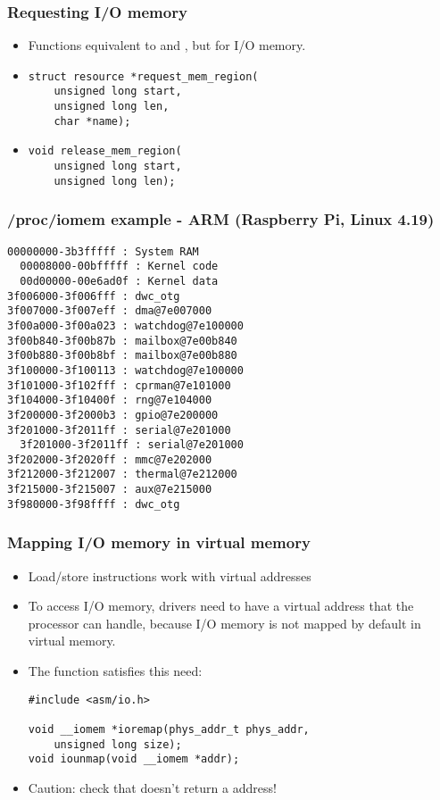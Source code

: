 \begin{frame}[fragile]
  \frametitle{Requesting I/O memory}
  \begin{itemize}
  \item Functions equivalent to  and
    , but for I/O memory.
  \item
\begin{verbatim}
struct resource *request_mem_region(
    unsigned long start,
    unsigned long len,
    char *name);
\end{verbatim}
  \item
\begin{verbatim}
void release_mem_region(
    unsigned long start,
    unsigned long len);
  \end{verbatim}
\end{itemize}
\end{frame}

\begin{frame}[fragile]
  \frametitle{/proc/iomem example - ARM (Raspberry Pi, Linux 4.19)}
{\small
\begin{verbatim}
00000000-3b3fffff : System RAM
  00008000-00bfffff : Kernel code
  00d00000-00e6ad0f : Kernel data
3f006000-3f006fff : dwc_otg
3f007000-3f007eff : dma@7e007000
3f00a000-3f00a023 : watchdog@7e100000
3f00b840-3f00b87b : mailbox@7e00b840
3f00b880-3f00b8bf : mailbox@7e00b880
3f100000-3f100113 : watchdog@7e100000
3f101000-3f102fff : cprman@7e101000
3f104000-3f10400f : rng@7e104000
3f200000-3f2000b3 : gpio@7e200000
3f201000-3f2011ff : serial@7e201000
  3f201000-3f2011ff : serial@7e201000
3f202000-3f2020ff : mmc@7e202000
3f212000-3f212007 : thermal@7e212000
3f215000-3f215007 : aux@7e215000
3f980000-3f98ffff : dwc_otg
\end{verbatim}
}
\end{frame}

\begin{frame}[fragile]
  \frametitle{Mapping I/O memory in virtual memory}
  \begin{itemize}
  \item Load/store instructions work with virtual addresses
  \item To access I/O memory, drivers need to have a virtual address
    that the processor can handle, because I/O memory is not mapped by
    default in virtual memory.
  \item The  function satisfies this need:
\begin{verbatim}
#include <asm/io.h>

void __iomem *ioremap(phys_addr_t phys_addr,
    unsigned long size);
void iounmap(void __iomem *addr);
\end{verbatim}
  \item Caution: check that  doesn't return a  address!
  \end{itemize}
\end{frame}

